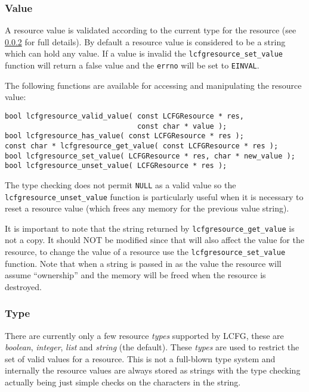 \documentclass[11pt,a4paper,titlepage]{article}
\begin{document}
\subsubsection{Value}
\label{subsec:res_value}

A resource value is validated according to the current type for the
resource (see \ref{subsec:res_type} for full details). By default a resource
value is considered to be a string which can hold any value. If a value
is invalid the \texttt{lcfgresource\_set\_value} function will return a
false value and the \texttt{errno} will be set to \texttt{EINVAL}.

The following functions are available for accessing and manipulating
the resource value:

\begin{verbatim}
bool lcfgresource_valid_value( const LCFGResource * res,
                               const char * value );
bool lcfgresource_has_value( const LCFGResource * res );
const char * lcfgresource_get_value( const LCFGResource * res );
bool lcfgresource_set_value( LCFGResource * res, char * new_value );
bool lcfgresource_unset_value( LCFGResource * res );
\end{verbatim}

The type checking does not permit \texttt{NULL} as a valid value so
the \texttt{lcfgresource\_unset\_value} function is particularly useful
when it is necessary to reset a resource value (which frees any memory
for the previous value string).

It is important to note that the string returned by
\texttt{lcfgresource\_get\_value} is not a copy. It should NOT be
modified since that will also affect the value for the resource, to
change the value of a resource use the \texttt{lcfgresource\_set\_value}
function. Note that when a string is passed in as the value the
resource will assume ``ownership'' and the memory will be freed when
the resource is destroyed.

\subsubsection{Type}
\label{subsec:res_type}

There are currently only a few resource \textit{types} supported by
LCFG, these are \textit{boolean}, \textit{integer}, \textit{list} and
\textit{string} (the default). These \textit{types} are used to
restrict the set of valid values for a resource. This is not a
full-blown type system and internally the resource values are always
stored as strings with the type checking actually being just simple
checks on the characters in the string.
\end{document}
